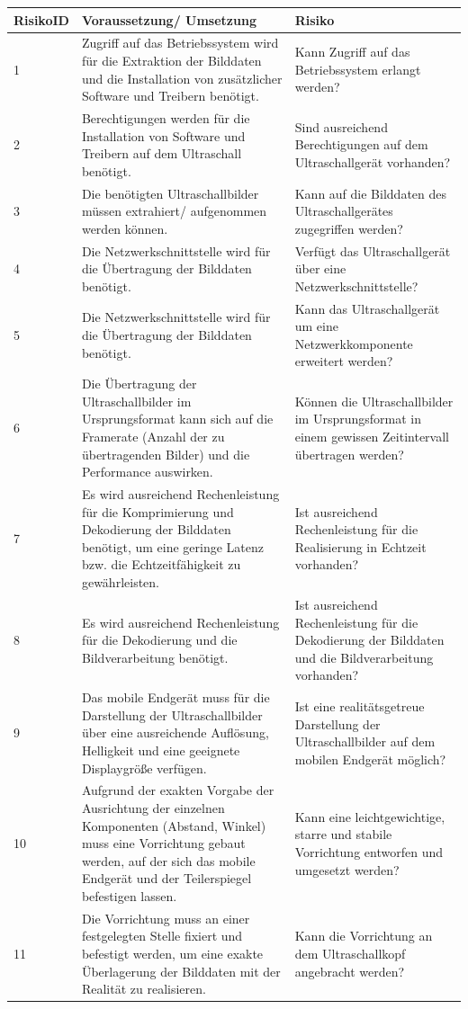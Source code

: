 \begin{center}
\begin{table} [H]
    \begin{tabular}{ | p{} | p{} | p{} |}
    \hline
   \textbf{RisikoID} &  \textbf{Voraussetzung/ Umsetzung} & \textbf{Risiko}\\
      \hline
      	1	
      & Zugriff auf das Betriebssystem wird für die Extraktion der Bilddaten und die Installation von zusätzlicher Software und Treibern benötigt. 	
      & Kann Zugriff auf das Betriebssystem erlangt werden? \\
      \hline
	  2	
	& Berechtigungen werden für die Installation von Software und Treibern auf dem Ultraschall benötigt.	
	& Sind ausreichend Berechtigungen auf dem Ultraschallgerät vorhanden? \\
	\hline
	3
	& Die benötigten Ultraschallbilder müssen extrahiert/ aufgenommen werden können.	
	& Kann auf die Bilddaten des Ultraschallgerätes zugegriffen werden? \\
	\hline
	4	
	& Die Netzwerkschnittstelle wird für die Übertragung der Bilddaten benötigt.	
	& Verfügt das Ultraschallgerät über eine Netzwerkschnittstelle? \\
	\hline
	5	
	& Die Netzwerkschnittstelle wird für die Übertragung der Bilddaten benötigt.	
	& Kann das Ultraschallgerät um eine Netzwerkkomponente erweitert werden? \\
	\hline
	6	
	& Die Übertragung der Ultraschallbilder im Ursprungsformat kann sich auf die Framerate (Anzahl der zu übertragenden Bilder) und die Performance auswirken.	
	& Können die Ultraschallbilder im Ursprungsformat in einem gewissen Zeitintervall übertragen werden? \\
	\hline
	7	
	& Es wird ausreichend Rechenleistung für die Komprimierung und Dekodierung der Bilddaten benötigt, um eine geringe Latenz bzw. die Echtzeitfähigkeit zu gewährleisten.	
	& Ist ausreichend Rechenleistung für die Realisierung in Echtzeit vorhanden? \\
	\hline
	8	
	& Es wird ausreichend Rechenleistung für die Dekodierung und die Bildverarbeitung benötigt.	
	& Ist ausreichend Rechenleistung für die Dekodierung der Bilddaten und die Bildverarbeitung vorhanden?\\
	\hline
	9	
	& Das mobile Endgerät muss für die Darstellung der Ultraschallbilder über eine ausreichende Auflösung, Helligkeit und eine geeignete Displaygröße verfügen.	
	& Ist eine realitätsgetreue Darstellung der Ultraschallbilder auf dem mobilen Endgerät möglich? \\
	\hline
	10	
	& Aufgrund der exakten Vorgabe der Ausrichtung der einzelnen Komponenten (Abstand, Winkel) muss eine Vorrichtung gebaut werden, auf der sich das mobile Endgerät und der Teilerspiegel befestigen lassen.	
	& Kann eine leichtgewichtige, starre und stabile Vorrichtung entworfen und umgesetzt werden? \\
	\hline
	11	
	& Die Vorrichtung muss  an einer festgelegten Stelle fixiert und befestigt werden, um eine exakte Überlagerung der Bilddaten mit der Realität zu realisieren.	
	& Kann die Vorrichtung an dem Ultraschallkopf angebracht werden? \\
\hline
  

\end{tabular}
\end{table}
\end{center}
